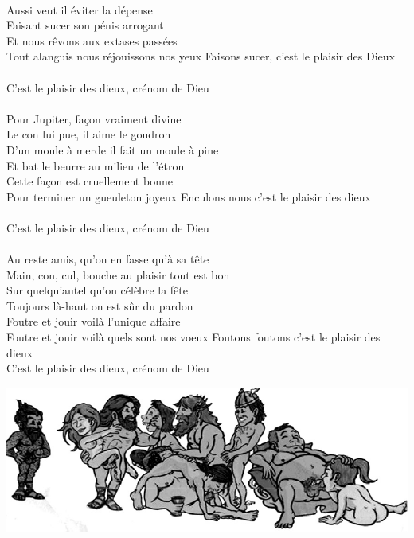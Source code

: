 \\Aussi veut il éviter la dépense
\\Faisant sucer son pénis arrogant
\\Et nous rêvons aux extases passées
\\Tout alanguis nous réjouissons nos yeux
{Faisons sucer, c'est le plaisir des Dieux  ~~~~~~~}
\\C'est le plaisir des dieux, crénom de Dieu
\\\\Pour Jupiter, façon vraiment divine
\\Le con lui pue, il aime le goudron
\\D'un moule à merde il fait un moule à pine
\\Et bat le beurre au milieu de l'étron
\\Cette façon est cruellement bonne
\\Pour terminer un gueuleton joyeux
{Enculons nous c'est le plaisir des dieux  ~~~~~~~}
\\C'est le plaisir des dieux, crénom de Dieu
\\\\Au reste amis, qu'on en fasse qu'à sa tête
\\Main, con, cul, bouche au plaisir tout est bon
\\Sur quelqu'autel qu'on célèbre la fête
\\Toujours là-haut on est sûr du pardon
\\Foutre et jouir voilà l'unique affaire
\\Foutre et jouir voilà quels sont nos voeux
{Foutons foutons c'est le plaisir des dieux  ~~~~~~~}
\\C'est le plaisir des dieux, crénom de Dieu
\begin{center}
   \includegraphics[width=1.1\textwidth]{images/plaisir_dieux.jpg}
 \end{center}

\breakpage